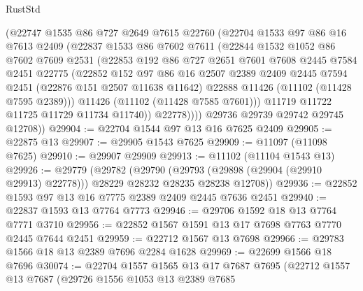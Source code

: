 \begin{lexlean}{RustStd}
\begin{coremodule}
            (@22747
              @1535
              @86
              @727
              @2649
              @7615
              @22760
              (@22704
                @1533
                @97
                @86
                @16
                @7613
                @2409
                (@22837
                  @1533
                  @86
                  @7602
                  @7611
                  (@22844
                    @1532
                    @1052
                    @86
                    @7602
                    @7609
                    @2531
                    (@22853
                      @192
                      @86
                      @727
                      @2651
                      @7601
                      @7608
                      @2445
                      @7584
                      @2451
                      @22775
                      (@22852
                        @152
                        @97
                        @86
                        @16
                        @2507
                        @2389
                        @2409
                        @2445
                        @7594
                        @2451
                        (@22876 @151 @2507 @11638 @11642)
                        @22888
                        @11426
                        (@11102 (@11428 @7595 @2389)))
                      @11426
                      (@11102 (@11428 @7585 @7601)))
                    @11719
                    @11722
                    @11725
                    @11729
                    @11734
                    @11740))
                @22778))))
        @29736
        @29739
        @29742
        @29745
        @12708))
@29904 := @22704 @1544 @97 @13 @16 @7625 @2409
@29905 := @22875 @13
@29907 := @29905 @1543 @7625
@29909 := @11097 (@11098 @7625)
@29910 := @29907 @29909
@29913 := @11102 (@11104 @1543 @13)
@29926 := @29779
    (@29782
      (@29790 (@29793 (@29898 (@29904 (@29910 @29913) @22778))) @28229 @28232 @28235 @28238 @12708))
@29936 := @22852 @1593 @97 @13 @16 @7775 @2389 @2409 @2445 @7636 @2451
@29940 := @22837 @1593 @13 @7764 @7773
@29946 := @29706 @1592 @18 @13 @7764 @7771 @3710
@29956 := @22852 @1567 @1591 @13 @17 @7698 @7763 @7770 @2445 @7644 @2451
@29959 := @22712 @1567 @13 @7698
@29966 := @29783 @1566 @18 @13 @2389 @7696 @2284 @1628
@29969 := @22699 @1566 @18 @7696
@30074 := @22704
    @1557
    @1565
    @13
    @17
    @7687
    @7695
    (@22712
      @1557
      @13
      @7687
      (@29726
        @1556
        @1053
        @13
        @2389
        @7685

\end{coremodule}
\end{lexlean}
